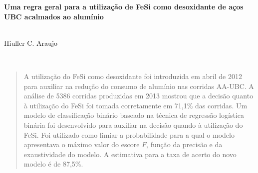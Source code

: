 \documentclass[10pt]{article}
\begin{document}
\begin{center}
{\sffamily \begin{huge}\textbf{
		Uma regra geral para a utilização de FeSi como desoxidante de aços UBC acalmados ao alumínio
	}\end{huge}\\[10pt]
{Hiuller C. Araujo}
}\\

	\begin{abstract}
		A utilização do FeSi como desoxidante foi introduzida em abril de 2012 para auxiliar na redução do consumo de alumínio nas corridas AA-UBC. A análise de 5386 corridas produzidas em 2013 mostrou que a decisão quanto à utilização do FeSi foi tomada corretamente em 71,1\% das corridas. Um modelo de classificação binário baseado na técnica de regressão logística binária foi desenvolvido para auxiliar na decisão quando à utilização do FeSi. Foi utilizado como limiar a probabilidade para a qual o modelo apresentava o máximo valor do escore $F$, função da precisão e da exaustividade do modelo. A estimativa para a taxa de acerto do novo modelo é de 87,5\%.
	\end{abstract}
\end{center}





\begin{multicols}{2}

	


% 
% 
\renewcommand{\bibname}{Referências}


\end{multicols}	
\end{document}
